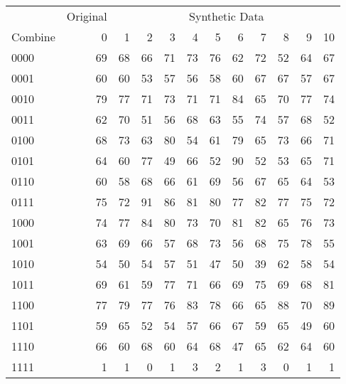 \begin{tabular}{lrrrrrrrrrrr}
  \toprule
   & \multicolumn{1}{l}{Original} & \multicolumn{10}{c}{Synthetic Data} \\ \cmidrule(lr){3-12}
 Combine & 0 & 1 & 2 & 3 & 4 & 5 & 6 & 7 & 8 & 9 & 10 \\ 
 \midrule
0000 & 69 & 68 & 66 & 71 & 73 & 76 & 62 & 72 & 52 & 64 & 67 \\ 
  0001 & 60 & 60 & 53 & 57 & 56 & 58 & 60 & 67 & 67 & 57 & 67 \\ 
  0010 & 79 & 77 & 71 & 73 & 71 & 71 & 84 & 65 & 70 & 77 & 74 \\ 
  0011 & 62 & 70 & 51 & 56 & 68 & 63 & 55 & 74 & 57 & 68 & 52 \\ 
  0100 & 68 & 73 & 63 & 80 & 54 & 61 & 79 & 65 & 73 & 66 & 71 \\ 
  0101 & 64 & 60 & 77 & 49 & 66 & 52 & 90 & 52 & 53 & 65 & 71 \\ 
  0110 & 60 & 58 & 68 & 66 & 61 & 69 & 56 & 67 & 65 & 64 & 53 \\ 
  0111 & 75 & 72 & 91 & 86 & 81 & 80 & 77 & 82 & 77 & 75 & 72 \\ 
  1000 & 74 & 77 & 84 & 80 & 73 & 70 & 81 & 82 & 65 & 76 & 73 \\ 
  1001 & 63 & 69 & 66 & 57 & 68 & 73 & 56 & 68 & 75 & 78 & 55 \\ 
  1010 & 54 & 50 & 54 & 57 & 51 & 47 & 50 & 39 & 62 & 58 & 54 \\ 
  1011 & 69 & 61 & 59 & 77 & 71 & 66 & 69 & 75 & 69 & 68 & 81 \\ 
  1100 & 77 & 79 & 77 & 76 & 83 & 78 & 66 & 65 & 88 & 70 & 89 \\ 
  1101 & 59 & 65 & 52 & 54 & 57 & 66 & 67 & 59 & 65 & 49 & 60 \\ 
  1110 & 66 & 60 & 68 & 60 & 64 & 68 & 47 & 65 & 62 & 64 & 60 \\ 
  1111 & 1 & 1 & 0 & 1 & 3 & 2 & 1 & 3 & 0 & 1 & 1 \\ 
   \bottomrule
\end{tabular}
